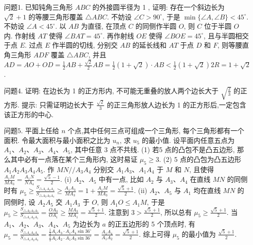
问题1. 已知钝角三角形 $A B C$ 的外接圆半径为 1 , 证明: 存在一个斜边长为 $\sqrt{2}+1$ 的等腰三角形覆盖 $\triangle A B C$.
不妨设 $\angle C>90^{\circ}$, 于是 $\min \{\angle A, \angle B\}<45^{\circ}$. 不妨设 $\angle A<45^{\circ}$. 以 $A B$ 为直径, 在顶点 $C$ 的同侧作半圆 $O$, 则 $C$ 位于半圆 $O$ 内.
作射线 $A T$ 使得 $\angle B A T=45^{\circ}$. 再作射线 $O E$ 使得 $\angle B O E=45^{\circ}$, 且与半圆相交于点 $E$. 过点 $E$ 作半圆的切线, 分别交 $A B$ 的延长线和 $A T$ 于点 $D$ 和 $F$, 则等腰直角三角形 $A D F$ 覆盖 $\triangle A B C$, 并且 $A D=A O+O D=\frac{1}{2} A B+\frac{\sqrt{2}}{2} A B=\frac{1}{2}(1+\sqrt{2}) \cdot A B<\frac{1}{2}(1+\sqrt{2}) 2 R=1+\sqrt{2}$.



问题4. 证明: 在边长为 1 的正方形内, 不可能无重叠的放人两个边长大于 $\sqrt{\frac{2}{3}}$ 的正方形.
提示: 只需证明边长大于 $\frac{\sqrt{2}}{3}$ 的正三角形放人边长为 1 的正方形后,一定包含该正方形的中心.



问题5. 平面上任给 $n$ 个点,其中任何三点可组成一个三角形, 每个三角形都有一个面积.
令最大面积与最小面积之比为 $u_n$, 求 $u_5$ 的最小值.
设平面内任意五点为 $A_1 、 A_2 、 A_3 、 A_4 、 A_5$, 其中任意 3 点不共线.
(1) 若5 点的凸包不是凸五边形, 那么其中必有一点落在某个三角形内, 这时易证 $\mu_5 \geqslant 3$. (2) 5 点的凸包为凸五边形 $A_1 A_2 A_3 A_4 A_5$. 作 $M N / / A_3 A_4$ 分别交 $A_1 A_3 、 A_1 A_4$ 于 $M$ 和 $N$, 且使得 $\frac{A_1 M}{M A_3}=\frac{A_1 N}{N A_4}=\frac{\sqrt{5}-1}{2}$. (i) $A_2 、 A_5$ 中有一点, 比如 $A_2$ 与 $A_3 、 A_4$ 在直线 $M N$ 的同侧时有 $\mu_5 \geqslant \frac{S_{\triangle A_1 A_3 A_4}}{S_{\triangle A_2 A_3 A_4}} \geqslant \frac{A_1 A_3}{M A_3}=1+\frac{A_1 M}{M A_3}= \frac{\sqrt{5}+1}{2}$. (ii) $A_2 、 A_5$ 与 $A_1$ 均在直线 $M N$ 的同侧时, 设 $A_2 A_5$ 交 $A_1 A_3$ 于 $O$, 则 $A_1 O \leqslant A_1 M$, 于是 $\mu_5 \geqslant \frac{S_{\triangle A_2 A_3 A_5}}{S_{\triangle A_1 A_2 A_5}}=\frac{O A_3}{O A_1} \geqslant \frac{M A_3}{M A_1}=\frac{\sqrt{5}+1}{2}$. 注意到 $3> \frac{\sqrt{5}+1}{2}$, 所以总有 $\mu_5 \geqslant \frac{\sqrt{5}+1}{2}$. 当 $A_1 、 A_2 、 A_3 、 A_4 、 A_5$ 为边长为 $a$ 的正五边形的 5 个顶点时, 有 $\mu_5=\frac{S_{\triangle A_1 A_3 A_4}}{S_{\triangle A_1 A_2 A_3}}=\frac{\frac{1}{2} A_1 A_3 \cdot A_1 A_4 \sin 36^{\circ}}{\frac{1}{2} A_1 A_2 \cdot A_1 A_3 \sin 36^{\circ}}=\frac{A_1 A_4}{A_1 A_2}= \frac{\sqrt{5}+1}{2}$. 综上可得 $\mu_5$ 的最小值为 $\frac{\sqrt{5}+1}{2}$.



